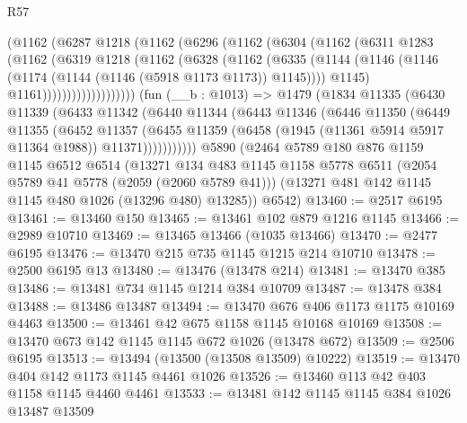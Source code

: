 \begin{lexlean}{R57}
\begin{coremodule}
              (@1162
                (@6287
                  @1218
                  (@1162
                    (@6296
                      (@1162
                        (@6304
                          (@1162
                            (@6311
                              @1283
                              (@1162
                                (@6319
                                  @1218
                                  (@1162
                                    (@6328
                                      (@1162
                                        (@6335
                                          (@1144
                                            (@1146
                                              (@1146
                                                (@1174 (@1144 (@1146 (@5918 @1173 @1173)) @1145))))
                                            @1145)
                                          @1161)))))))))))))))))))
    (fun (__b : @1013) =>
    @1479
      (@1834
        @11335
        (@6430
          @11339
          (@6433
            @11342
            (@6440
              @11344
              (@6443
                @11346
                (@6446
                  @11350
                  (@6449
                    @11355
                    (@6452
                      @11357
                      (@6455
                        @11359
                        (@6458 (@1945 (@11361 @5914 @5917 @11364 @1988)) @11371)))))))))))
    @5890
    (@2464
      @5789
      @180
      @876
      @1159
      @1145
      @6512
      @6514
      (@13271
        @134
        @483
        @1145
        @1158
        @5778
        @6511
        (@2054 @5789 @41 @5778 (@2059 (@2060 @5789 @41)))
        (@13271 @481 @142 @1145 @1145 @480 @1026 (@13296 @480) @13285))
      @6542)
@13460 := @2517 @6195
@13461 := @13460 @150
@13465 := @13461 @102 @879 @1216 @1145
@13466 := @2989 @10710
@13469 := @13465 @13466 (@1035 @13466)
@13470 := @2477 @6195
@13476 := @13470 @215 @735 @1145 @1215 @214 @10710
@13478 := @2500 @6195 @13
@13480 := @13476 (@13478 @214)
@13481 := @13470 @385
@13486 := @13481 @734 @1145 @1214 @384 @10709
@13487 := @13478 @384
@13488 := @13486 @13487
@13494 := @13470 @676 @406 @1173 @1175 @10169 @4463
@13500 := @13461 @42 @675 @1158 @1145 @10168 @10169
@13508 := @13470 @673 @142 @1145 @1145 @672 @1026 (@13478 @672)
@13509 := @2506 @6195
@13513 := @13494 (@13500 (@13508 @13509) @10222)
@13519 := @13470 @404 @142 @1173 @1145 @4461 @1026
@13526 := @13460 @113 @42 @403 @1158 @1145 @4460 @4461
@13533 := @13481 @142 @1145 @1145 @384 @1026 @13487 @13509

\end{coremodule}
\end{lexlean}

